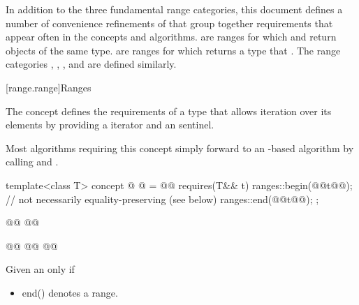 {\pnum
In addition to the three fundamental range categories, this document defines
a number of convenience refinements of  that group together requirements
that appear often in the concepts and algorithms.
 are ranges for which
 and  return objects of the
same type.  are ranges for which
 returns a type that  
. The range
categories ,
,
, and
 are defined similarly.

[range.range]{Ranges}

\pnum
The  concept defines the requirements of a type that allows
iteration over its elements by providing a  iterator and an
 sentinel.
\begin{note}
Most algorithms requiring this concept simply forward to an
-based algorithm by calling  and .
\end{note}

%
\begin{itemdecl}
template<class T>
concept @ @ = @\newtxt{// \expos}@
  requires(T&& t) {
    ranges::begin(@@t@\newtxt{)}@); // not necessarily equality-preserving (see below)
    ranges::end(@@t@\newtxt{)}@);
  };

@@
@@

@@
@@
  @@
\end{itemdecl}

\begin{itemdescr}
\pnum
Given an 
 only if

\begin{itemize}
\item {}%
{end()} denotes a range.


\end{itemize}
\end{itemdescr}}
